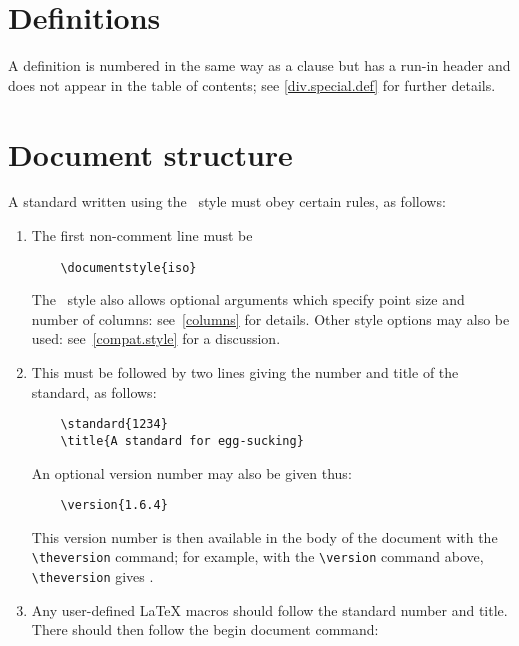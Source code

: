 \section{Definitions}
\label{definitions}
\label{def.def}
A definition is numbered in the same way as a clause but has a run-in
header and does not appear in the table of contents; see
\ref{div.special.def} for further details.

\section{Document structure}
A standard written using the \iso\ style must obey certain rules, as
follows:
\begin{enumerate}
\item\label{structure.general.documentstyle}
    The first non-comment line must be
    \begin{verbatim}
    \documentstyle{iso}
    \end{verbatim}
\begin{note}
    The \iso\ style also allows optional arguments which specify 
    point size and number of columns: see~\ref{columns} for details.
    Other style options may also be used: see~\ref{compat.style} for
    a discussion.
\end{note}

\item\label{structure.general.title}
    This must be followed by two lines giving the number and title of
    the standard, as follows:
    \begin{verbatim}
    \standard{1234}
    \title{A standard for egg-sucking}
    \end{verbatim}

\begin{note}
    An optional version number may also be given thus:
    \begin{verbatim}
    \version{1.6.4}
    \end{verbatim}
    This version number is then available in the body of the document with
    the \verb|\theversion| command; for example, with the \verb|\version|
    command above, \verb|\theversion| gives \theversion.
\end{note}

\item Any user-defined LaTeX macros should follow the standard number
    and title. There should then follow the begin document command:
    \begin{verbatim}
    

\end{verbatim}
\end{enumerate}
